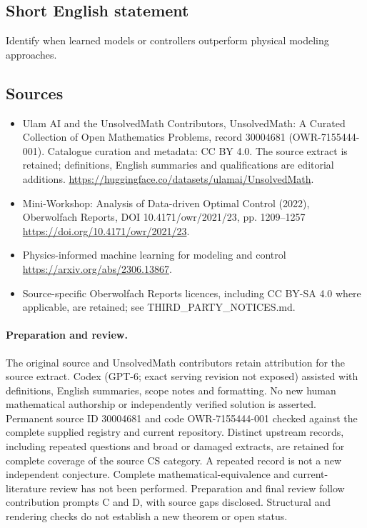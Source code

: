 \documentclass[11pt]{article}
\begin{document}
\subsection{Short English statement}
Identify when learned models or controllers outperform physical modeling approaches.
\subsection{Sources}
\begin{itemize}
\item[\hypertarget{source:30004681:1}{S1}] Ulam AI and the UnsolvedMath Contributors, UnsolvedMath: A Curated Collection of Open Mathematics Problems, record 30004681 (OWR-7155444-001). Catalogue curation and metadata: CC BY 4.0. The source extract is retained; definitions, English summaries and qualifications are editorial additions.
\url{https://huggingface.co/datasets/ulamai/UnsolvedMath}.
\item[\hypertarget{source:30004681:2}{S2}] Mini-Workshop: Analysis of Data-driven Optimal Control (2022), Oberwolfach Reports, DOI 10.4171/owr/2021/23, pp. 1209--1257
\url{https://doi.org/10.4171/owr/2021/23}.
\item[\hypertarget{source:30004681:3}{S3}] Physics-informed machine learning for modeling and control
\url{https://arxiv.org/abs/2306.13867}.
\item Source-specific Oberwolfach Reports licences, including CC BY-SA 4.0 where applicable, are retained; see THIRD\_PARTY\_NOTICES.md.
\end{itemize}
\paragraph{Preparation and review.}
The original source and UnsolvedMath contributors retain attribution for the source extract. Codex (GPT-6; exact serving revision not exposed) assisted with definitions, English summaries, scope notes and formatting. No new human mathematical authorship or independently verified solution is asserted. Permanent source ID 30004681 and code OWR-7155444-001 checked against the complete supplied registry and current repository. Distinct upstream records, including repeated questions and broad or damaged extracts, are retained for complete coverage of the source CS category. A repeated record is not a new independent conjecture. Complete mathematical-equivalence and current-literature review has not been performed. Preparation and final review follow contribution prompts C and D, with source gaps disclosed. Structural and rendering checks do not establish a new theorem or open status.
\label{end:30004681}
\end{document}

